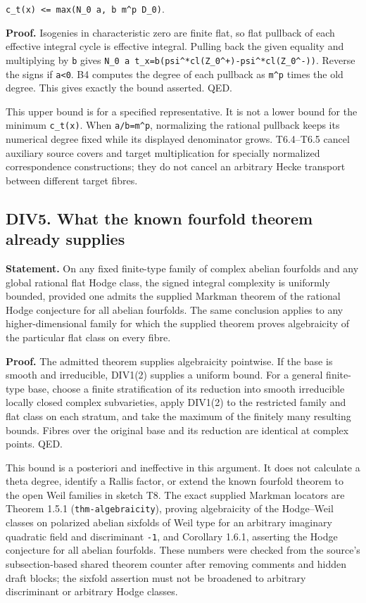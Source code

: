 \documentclass[11pt,a4paper]{article}
\theoremstyle{definition}
\begin{document}
\texttt{c\_t(x)\ \textless{}=\ max(N\_0\ \textbar{}a\textbar{},\ b\ m\^{}p\ D\_0)}.

\textbf{Proof.} Isogenies in characteristic zero are finite flat, so
flat pullback of each effective integral cycle is effective integral.
Pulling back the given equality and multiplying by \texttt{b} gives
\texttt{N\_0\ a\ t\_x=b(psi\^{}*cl(Z\_0\^{}+)-psi\^{}*cl(Z\_0\^{}-))}.
Reverse the signs if \texttt{a\textless{}0}. B4 computes the degree of
each pullback as \texttt{m\^{}p} times the old degree. This gives
exactly the bound asserted. QED.

This upper bound is for a specified representative. It is not a lower
bound for the minimum \texttt{c\_t(x)}. When \texttt{a/b=m\^{}p},
normalizing the rational pullback keeps its numerical degree fixed while
its displayed denominator grows. T6.4--T6.5 cancel auxiliary source
covers and target multiplication for specially normalized correspondence
constructions; they do not cancel an arbitrary Hecke transport between
different target fibres.

\subsection{DIV5. What the known fourfold theorem already
supplies}\label{div5.-what-the-known-fourfold-theorem-already-supplies}

\textbf{Statement.} On any fixed finite-type family of complex abelian
fourfolds and any global rational flat Hodge class, the signed integral
complexity is uniformly bounded, provided one admits the supplied
Markman theorem of the rational Hodge conjecture for all abelian
fourfolds. The same conclusion applies to any higher-dimensional family
for which the supplied theorem proves algebraicity of the particular
flat class on every fibre.

\textbf{Proof.} The admitted theorem supplies algebraicity pointwise. If
the base is smooth and irreducible, DIV1(2) supplies a uniform bound.
For a general finite-type base, choose a finite stratification of its
reduction into smooth irreducible locally closed complex subvarieties,
apply DIV1(2) to the restricted family and flat class on each stratum,
and take the maximum of the finitely many resulting bounds. Fibres over
the original base and its reduction are identical at complex points.
QED.

This bound is a posteriori and ineffective in this argument. It does not
calculate a theta degree, identify a Rallis factor, or extend the known
fourfold theorem to the open Weil families in sketch T8. The exact
supplied Markman locators are Theorem 1.5.1 (\texttt{thm-algebraicity}),
proving algebraicity of the Hodge--Weil classes on polarized abelian
sixfolds of Weil type for an arbitrary imaginary quadratic field and
discriminant \texttt{-1}, and Corollary 1.6.1, asserting the Hodge
conjecture for all abelian fourfolds. These numbers were checked from
the source's subsection-based shared theorem counter after removing
comments and hidden draft blocks; the sixfold assertion must not be
broadened to arbitrary discriminant or arbitrary Hodge classes.
\end{document}
